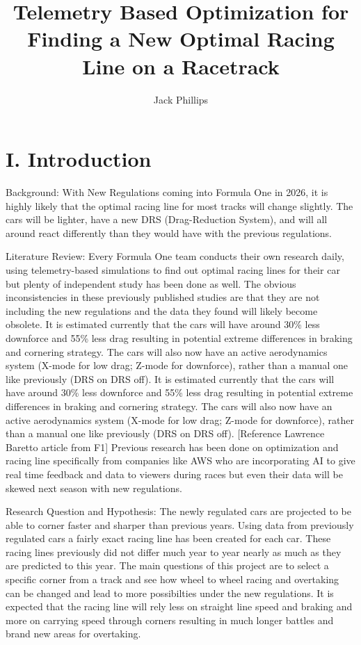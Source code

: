 \documentclass[11pt]{article} %
\title{Telemetry Based Optimization for Finding a New Optimal Racing Line on a Racetrack}
\author{Jack Phillips}
\begin{document}
\maketitle

\section{I.	Introduction}

Background: With New Regulations coming into Formula One in 2026, it is highly likely that the optimal racing line for most tracks will change slightly. The cars will be lighter, have a new DRS (Drag-Reduction System), and will all around react differently than they would have with the previous regulations. 

Literature Review: Every Formula One team conducts their own research daily, using telemetry-based simulations to find out optimal racing lines for their car but plenty of independent study has been done as well. The obvious inconsistencies in these previously published studies are that they are not including the new regulations and the data they found will likely become obsolete. It is estimated currently that the cars will have around 30\% less downforce and 55\% less drag resulting in potential extreme differences in braking and cornering strategy. The cars will also now have an active aerodynamics system (X-mode for low drag; Z-mode for downforce), rather than a manual one like previously (DRS on DRS off).
It is estimated currently that the cars will have around 30\% less downforce and 55\% less drag resulting in potential extreme differences in braking and cornering strategy. The cars will also now have an active aerodynamics system (X-mode for low drag; Z-mode for downforce), rather than a manual one like previously (DRS on DRS off). [Reference Lawrence Baretto article from F1] Previous research has been done on optimization and racing line specifically from companies like AWS who are incorporating AI to give real time feedback and data to viewers during races but even their data will be skewed next season with new regulations. 

Research Question and Hypothesis: The newly regulated cars are projected to be able to corner faster and sharper than previous years. Using data from previously regulated cars a fairly exact racing line has been created for each car. These racing lines previously did not differ much year to year nearly as much as they are predicted to this year. The main questions of this project are to select a specific corner from a track and see how wheel to wheel racing and overtaking can be changed and lead to more possibilties under the new regulations. It is expected that the racing line will rely less on straight line speed and braking and more on carrying speed through corners resulting in much longer battles and brand new areas for overtaking.
\end{document}
